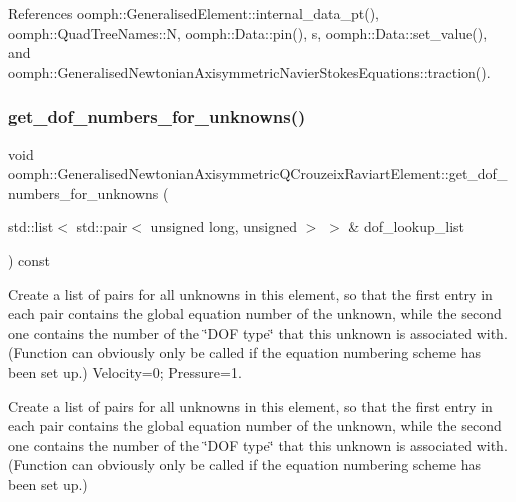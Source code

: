 References oomph\+::\+Generalised\+Element\+::internal\+\_\+data\+\_\+pt(), oomph\+::\+Quad\+Tree\+Names\+::N, oomph\+::\+Data\+::pin(), s, oomph\+::\+Data\+::set\+\_\+value(), and oomph\+::\+Generalised\+Newtonian\+Axisymmetric\+Navier\+Stokes\+Equations\+::traction().

\mbox{\label{classoomph_1_1GeneralisedNewtonianAxisymmetricQCrouzeixRaviartElement_a986a8326bbeda5ad9dd1f69c5d2b9e07}} 
\subsubsection{\texorpdfstring{get\+\_\+dof\+\_\+numbers\+\_\+for\+\_\+unknowns()}{get\_dof\_numbers\_for\_unknowns()}}
{\footnotesize\ttfamily void oomph\+::\+Generalised\+Newtonian\+Axisymmetric\+Q\+Crouzeix\+Raviart\+Element\+::get\+\_\+dof\+\_\+numbers\+\_\+for\+\_\+unknowns (\begin{DoxyParamCaption}\item[{std\+::list$<$ std\+::pair$<$ unsigned long, unsigned $>$ $>$ \&}]{dof\+\_\+lookup\+\_\+list }\end{DoxyParamCaption}) const\hspace{0.3cm}{\ttfamily [virtual]}}



Create a list of pairs for all unknowns in this element, so that the first entry in each pair contains the global equation number of the unknown, while the second one contains the number of the \char`\"{}\+D\+O\+F type\char`\"{} that this unknown is associated with. (Function can obviously only be called if the equation numbering scheme has been set up.) Velocity=0; Pressure=1. 

Create a list of pairs for all unknowns in this element, so that the first entry in each pair contains the global equation number of the unknown, while the second one contains the number of the \char`\"{}\+D\+O\+F type\char`\"{} that this unknown is associated with. (Function can obviously only be called if the equation numbering scheme has been set up.) 

